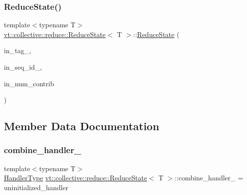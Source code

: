 \subsubsection{\texorpdfstring{Reduce\+State()}{ReduceState()}}
{\footnotesize\ttfamily template$<$typename T$>$ \\
\hyperlink{structvt_1_1collective_1_1reduce_1_1_reduce_state}{vt\+::collective\+::reduce\+::\+Reduce\+State}$<$ T $>$\+::\hyperlink{structvt_1_1collective_1_1reduce_1_1_reduce_state}{Reduce\+State} (\begin{DoxyParamCaption}\item[{\hyperlink{namespacevt_a84ab281dae04a52a4b243d6bf62d0e52}{Tag\+Type}}]{in\+\_\+tag\+\_\+,  }\item[{\hyperlink{namespacevt_a3063d4db3b879d6dd2c7b8d50995c7f6}{Sequential\+I\+D\+Type}}]{in\+\_\+seq\+\_\+id\+\_\+,  }\item[{\hyperlink{structvt_1_1collective_1_1reduce_1_1_reduce_state_adda7ff0ae58325a43a0a8bad447a8bfb}{Reduce\+Num\+Type}}]{in\+\_\+num\+\_\+contrib }\end{DoxyParamCaption})\hspace{0.3cm}{\ttfamily [inline]}}



\subsection{Member Data Documentation}
\mbox{\label{structvt_1_1collective_1_1reduce_1_1_reduce_state_a4b2d07f4e71a43db313f0ca84420e1df}} 
\subsubsection{\texorpdfstring{combine\+\_\+handler\+\_\+}{combine\_handler\_}}
{\footnotesize\ttfamily template$<$typename T$>$ \\
\hyperlink{namespacevt_af64846b57dfcaf104da3ef6967917573}{Handler\+Type} \hyperlink{structvt_1_1collective_1_1reduce_1_1_reduce_state}{vt\+::collective\+::reduce\+::\+Reduce\+State}$<$ T $>$\+::combine\+\_\+handler\+\_\+ = uninitialized\+\_\+handler}

